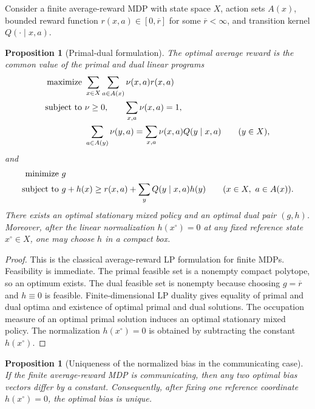 \documentclass[12pt]{article}
\newtheorem{proposition}[theorem]{Proposition}
\theoremstyle{definition}
\newcommand{\1}{\mathbf{1}}
\begin{document}
Consider a finite average-reward MDP with state space $X$, action sets $A(x)$,
bounded reward function $r(x,a)\in[0,\overline r]$ for some $\overline r<\infty$,
and transition kernel $Q(\cdot\mid x,a)$.

\begin{proposition}[Primal-dual formulation]
\label{prop:mdp-duality}
The optimal average reward is the common value of the primal and dual linear
programs
\begin{align*}
\textnormal{maximize }&\sum_{x\in X}\sum_{a\in A(x)}\nu(x,a)r(x,a)
\\
\textnormal{subject to }&\nu\ge 0,
\qquad \sum_{x,a}\nu(x,a)=1,
\\
&\sum_{a\in A(y)}\nu(y,a)=\sum_{x,a}\nu(x,a)Q(y\mid x,a)
\qquad (y\in X),
\end{align*}
and
\begin{align*}
\textnormal{minimize }&g
\\
\textnormal{subject to }&g+h(x)\ge r(x,a)+\sum_y Q(y\mid x,a)h(y)
\qquad (x\in X,\ a\in A(x)).
\end{align*}
There exists an optimal stationary mixed policy and an optimal dual pair $(g,h)$.
Moreover, after the linear normalization $h(x^\circ)=0$ at any fixed reference
state $x^\circ\in X$, one may choose $h$ in a compact box.
\end{proposition}

\begin{proof}
This is the classical average-reward LP formulation for finite MDPs. Feasibility is
immediate. The primal feasible set is a nonempty compact polytope, so an optimum
exists. The dual feasible set is nonempty because choosing $g=\overline r$ and
$h\equiv 0$ is feasible. Finite-dimensional LP duality gives equality of primal
and dual
optima and existence of optimal primal and dual solutions. The occupation measure
of an optimal primal solution induces an optimal stationary mixed policy. The
normalization $h(x^\circ)=0$ is obtained by subtracting the constant $h(x^\circ)$.
\end{proof}

\begin{proposition}[Uniqueness of the normalized bias in the communicating case]
\label{prop:bias-unique}
If the finite average-reward MDP is communicating, then any two optimal bias
vectors differ by a constant. Consequently, after fixing one reference coordinate
$h(x^\circ)=0$, the optimal bias is unique.
\end{proposition}
\end{document}
